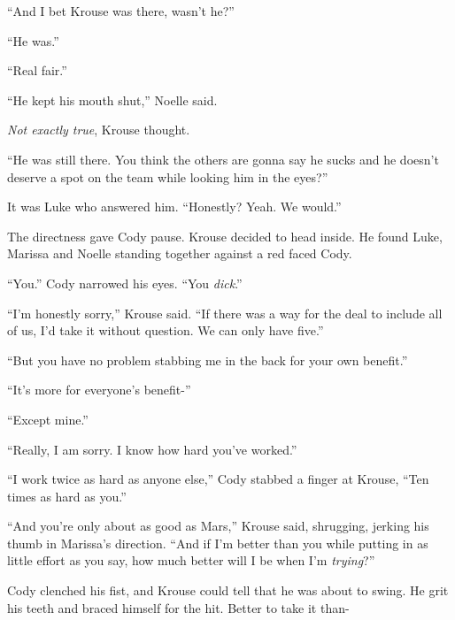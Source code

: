 ``And I bet Krouse was there, wasn't he?''



``He was.''



``Real fair.''



``He kept his mouth shut,'' Noelle said.



\emph{Not exactly true}, Krouse thought.



``He was still there.  You think the others are gonna say he sucks and he doesn't deserve a spot on the team while looking him in the eyes?''



It was Luke who answered him.  ``Honestly?  Yeah.  We would.''



The directness gave Cody pause.  Krouse decided to head inside.  He found Luke, Marissa and Noelle standing together against a red faced Cody.



``You.'' Cody narrowed his eyes.  ``You \emph{dick}.''



``I'm honestly sorry,'' Krouse said.  ``If there was a way for the deal to include all of us, I'd take it without question.  We can only have five.''



``But you have no problem stabbing me in the back for your own benefit.''



``It's more for everyone's benefit-''



``Except mine.''



``Really, I am sorry.  I know how hard you've worked.''



``I work twice as hard as anyone else,'' Cody stabbed a finger at Krouse, ``Ten times as hard as you.''



``And you're only about as good as Mars,'' Krouse said, shrugging, jerking his thumb in Marissa's direction.  ``And if I'm better than you while putting in as little effort as you say, how much better will I be when I'm\emph{ trying}?''



Cody clenched his fist, and Krouse could tell that he was about to swing.  He grit his teeth and braced himself for the hit.  Better to take it than-



